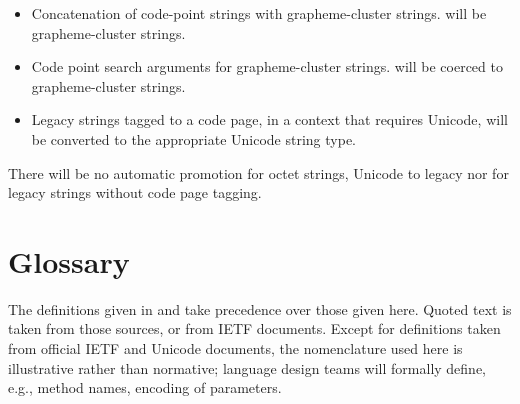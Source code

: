 \documentclass[b4paper]{article}
\begin{document}
\begin{itemize}
\item Concatenation of code-point strings with grapheme-cluster strings.
will be grapheme-cluster strings.
\item Code point search arguments for grapheme-cluster strings.
will be coerced to grapheme-cluster strings.
\item Legacy strings tagged to a code page, in a context that requires Unicode,
will be converted to the appropriate Unicode string type.
\end{itemize}

There will be no automatic promotion for octet strings, Unicode to
legacy nor for legacy strings without code page tagging.


\section{Glossary}


The definitions given in \cite{USTD:Gloss} and \cite{Unicode} take
precedence over those given here. Quoted text is taken from those sources, or from IETF documents.
Except for definitions taken from official IETF and Unicode documents,
the nomenclature used here is illustrative rather than normative;
language design teams will formally define, e.g., method names, encoding of parameters.
\end{document}
